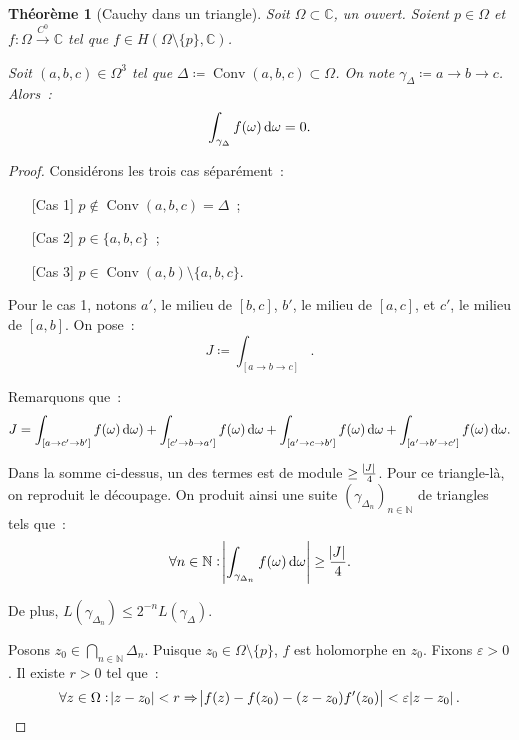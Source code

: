 \documentclass{report}
\newtheorem{thm}{Théorème}[chapter]
\theoremstyle{definition}
\theoremstyle{remark}
\numberwithin{equation}{section}
\newcommand{\C}{\mathbb C}
\newcommand{\N}{\mathbb N}
\DeclareMathOperator{\Conv}{Conv}
\newcommand{\toC}[1]{\xrightarrow{C^{#1}}}
\newcommand{\tocont}{\toC 0}
\begin{document}
			\begin{thm}[Cauchy dans un triangle] Soit $\Omega \subset \C$, un ouvert. Soient $p \in \Omega$ et $f : \Omega \tocont \C$ tel que
			$f \in H(\Omega \setminus \{p\}, \C)$.

			Soit $(a, b, c) \in \Omega^3$ tel que $\Delta \coloneqq \Conv(a, b, c)\subset \Omega$. On note $\gamma_\Delta \coloneqq a \to b \to c$. Alors~:
			\begin{equation}
				\int_{\gamma_\Delta} f(\omega)\dif \omega = 0.
			\end{equation}
			\end{thm}

			\begin{proof} Considérons les trois cas séparément~:
			\begin{itemize}
				\item[{[Cas 1]}] $p \not \in \Conv(a, b, c) = \Delta$~;
				\item[{[Cas 2]}] $p \in \{a, b, c\}$~;
				\item[{[Cas 3]}] $p \in \Conv(a, b) \setminus \{a, b, c\}$.
			\end{itemize}

			Pour le cas 1, notons $a'$, le milieu de $[b, c]$, $b'$, le milieu de $[a, c]$, et $c'$, le milieu de $[a, b]$.
			On pose~:
			\begin{equation}
				J \coloneqq \int_{[a \to b \to c]}.
			\end{equation}

			Remarquons que~:
			\begin{equation}
				J = \int_{[a \to c' \to b']}f(\omega)\dif \omega) + \int_{[c' \to b \to a']} f(\omega)\dif \omega + \int_{[a' \to c \to b']} f(\omega)\dif \omega
					+ \int_{[a' \to b' \to c']}f(\omega)\dif \omega.
			\end{equation}

			Dans la somme ci-dessus, un des termes est de module $\geq \frac {\abs J}4$. Pour ce triangle-là, on reproduit le découpage. On produit ainsi
			une suite $(\gamma_{\Delta_n})_{n \in \N}$ de triangles tels que~:
			\begin{equation}
				\forall n \in \N : \abs {\int_{\gamma_{\Delta_n}} f(\omega)\dif \omega} \geq \frac {\abs J}4.
			\end{equation}

			De plus, $L(\gamma_{\Delta_n}) \leq 2^{-n}L(\gamma_\Delta)$.

			Posons $z_0 \in \bigcap_{n \in \N} \Delta_n$. Puisque $z_0 \in \Omega \setminus \{p\}$, $f$ est holomorphe en $z_0$. Fixons $\varepsilon > 0$.
			Il existe $r > 0$ tel que~:
			\begin{equation}
				\forall z \in \Omega : \abs {z-z_0} < r \Rightarrow \abs {f(z) - f(z_0) - (z-z_0)f'(z_0)} < \varepsilon\abs {z - z_0}.
			\end{equation}


\end{proof}
\end{document}
